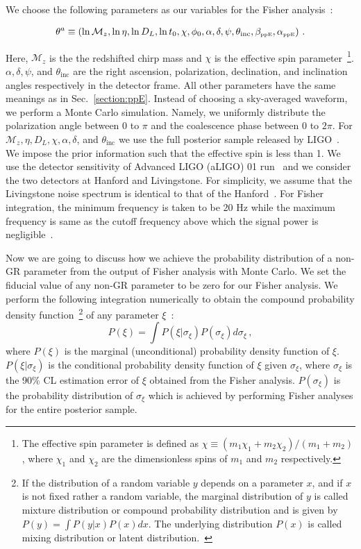\documentclass[prd,twocolumn,nofootinbib]{revtex4-1}
\newcommand\be{\begin{equation}}
\newcommand\ba{\begin{eqnarray}}
\newcommand\ee{\end{equation}}
\newcommand\ea{\end{eqnarray}}
\newcommand\bw{\begin{widetext}}
\newcommand\ew{\end{widetext}}
\newcommand{\lb}{\left(}
\newcommand{\rb}{\right)}
\newcommand{\PPE}{{\mbox{\tiny ppE}}}
\begin{document}
We choose the following parameters as our variables for the Fisher analysis~:
\bw
\ba
\theta^a\equiv \lb \ln{\mathcal{M}_z}, \ln{\eta}, \ln{D_L}, \ln{t_0}, \chi, \phi_0, \alpha, \delta, \psi, \theta_{\text{inc}}, \beta_{\PPE}, \alpha_{\PPE} \rb\,.
\ea
\ew
Here, $\mathcal{M}_z$ is the the redshifted chirp mass and $\chi$ is the effective spin parameter~\footnote{The effective spin parameter is defined as $\chi\equiv\lb m_1 \chi_1+m_2\chi_2\rb /\lb m_1+m_2\rb$, where $\chi_1$ and $\chi_2$ are the dimensionless spins of $m_1$ and $m_2$ respectively.}. $\alpha, \delta, \psi$, and  $\theta_{\text{inc}}$ are the right ascension, polarization, declination, and inclination angles respectively in the detector frame. All other parameters have the same meanings as in Sec.~\ref{section:ppE}. 
Instead of choosing a sky-averaged waveform, we perform a Monte Carlo simulation. Namely, we uniformly distribute the polarization angle between $0$ to $\pi$ and the coalescence phase between $0$ to $2\pi$. For $\mathcal{M}_z, \eta, D_L, \chi, \alpha, \delta$, and $\theta_{\text{inc}}$ we use the full posterior sample released by LIGO~\cite{ligo:sample}. 
We impose the prior information such that the effective spin is less than 1.
We use the detector sensitivity of Advanced LIGO (aLIGO) 01 run~\cite{LIGOScientific:2018mvr} and we consider the two detectors at Hanford and Livingstone. For simplicity, we assume that the Livingstone noise spectrum is identical to that of the Hanford~\cite{Yunes:2009yz}. For Fisher integration, the minimum frequency is taken to be 20 Hz while the maximum frequency is same as the cutoff frequency above which the signal power is negligible~\cite{Ajith:2009bn}.


Now we are going to discuss how we achieve the probability distribution of a non-GR parameter from the output of Fisher analysis with Monte Carlo. We set the  fiducial value of any non-GR parameter to be zero for our Fisher analysis. We perform the following integration numerically to obtain the compound probability density function~\footnote{If the distribution of a random variable $y$ depends on a parameter $x$, and if $x$ is not fixed rather a random variable, the marginal distribution of $y$ is called mixture distribution or compound probability distribution and is given by $P\left(y\right)=\int P\left(y|x\right) P\left(x\right)dx$. The underlying distribution $P\left(x\right)$ is called mixing distribution or latent distribution.~\cite{2016arXiv160204060R}} of any parameter $\xi$~:
\be
\label{eq3:1}
P\lb\xi\rb=\int P\lb \xi|\sigma_{\xi}\rb P\lb \sigma_{\xi}\rb d\sigma_{\xi}\,,
\ee
where $P\lb\xi\rb$ is the marginal (unconditional) probability density function of $\xi$. $P\lb \xi|\sigma_{\xi}\rb$ is the conditional probability density function of $\xi$ given $\sigma_\xi$, where $\sigma_\xi$ is the 90\% CL estimation error of $\xi$ obtained from the Fisher analysis. $P\lb\sigma_\xi\rb$ is the probability distribution of $\sigma_\xi$ which is achieved by performing Fisher analyses for the entire posterior sample.
\end{document}
